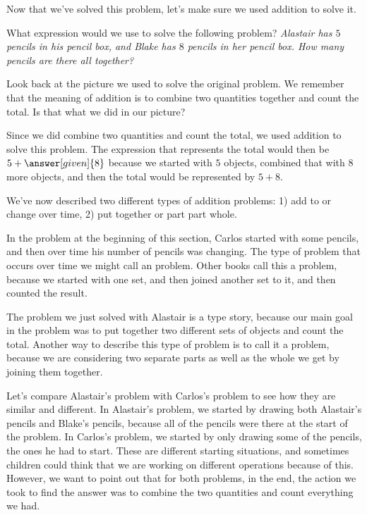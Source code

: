 \documentclass{ximera}
\begin{document}
Now that we've solved this problem, let's make sure we used addition to solve it.

\begin{question}
What expression would we use to solve the following problem? \emph{Alastair has $5$ pencils in his pencil box, and Blake has $8$ pencils in her pencil box. How many pencils are there all together?}

\begin{explanation}
Look back at the picture we used to solve the original problem. We remember that the meaning of addition is to combine two quantities together and count the total. Is that what we did in our picture?
\begin{multipleChoice}
\end{multipleChoice}

Since we did combine two quantities and count the total, we used addition to solve this problem. The expression that represents the total would then be $5 + \answer[given]{8}$ because we started with $5$ objects, combined that with $8$ more objects, and then the total would be represented by $5+8$.
\end{explanation}
\end{question}

We've now described two different types of addition problems: 1) add to or change over time, 2) put together or part part whole.

In the problem at the beginning of this section, Carlos started with some pencils, and then over time his 
number of pencils was changing. The type of problem that occurs over time we might call an  problem. 
Other books call this a  problem, because we started with one set, and then joined another set 
to it, and then counted the result.

The problem we just solved with Alastair is a  type story, because our main goal in the problem was to put together two different sets of objects and count the total. Another way to describe this type of problem is to call it a  problem, because we are considering two separate parts as well as the whole we get by joining them together. 

Let's compare Alastair's problem with Carlos's problem to see how they are similar and different. In Alastair's problem, we started by drawing both Alastair's pencils and Blake's pencils, because all of the pencils were there at the start of the problem. In Carlos's problem, we started by only drawing some of the pencils, the ones he had to start. These are different starting situations, and sometimes children could think that we are working on different operations because of this. However, we want to point out that for both problems, in the end, the action we took to find the answer was to combine the two quantities and count everything we had. 
\end{document}

